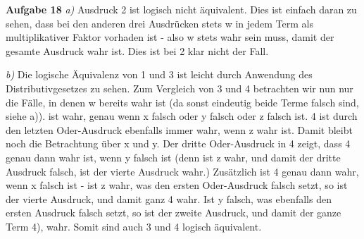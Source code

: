 \documentclass{article}
\begin{document}
\textbf{Aufgabe 18} \newline
\textit{a)}
Ausdruck 2 ist logisch nicht äquivalent. Dies ist einfach daran zu sehen, dass bei den anderen drei Ausdrücken stets w in jedem Term als multiplikativer Faktor vorhaden ist - also w stets wahr sein muss, damit der gesamte Ausdruck wahr ist. Dies ist bei 2 klar nicht der Fall. \linebreak

\textit{b)} Die logische Äquivalenz von 1 und 3 ist leicht durch Anwendung des Distributivgesetzes zu sehen. Zum Vergleich von 3 und 4 betrachten wir nun nur die Fälle, in denen w bereits wahr ist (da sonst eindeutig beide Terme falsch sind, siehe a)).  ist wahr, genau wenn x falsch oder y falsch oder z falsch ist. 4 ist durch den letzten Oder-Ausdruck ebenfalls immer wahr, wenn z wahr ist.
Damit bleibt noch die Betrachtung über x und y. \newline
Der dritte Oder-Ausdruck in 4 zeigt, dass 4 genau dann wahr ist, wenn y falsch ist (denn ist z wahr, und damit der dritte Ausdruck falsch, ist der vierte Ausdruck wahr.) \newline
Zusätzlich ist 4 genau dann wahr, wenn x falsch ist - ist z wahr, was den ersten Oder-Ausdruck falsch setzt, so ist der vierte Ausdruck, und damit ganz 4 wahr. Ist y falsch, was ebenfalls den ersten Ausdruck falsch setzt, so ist der zweite Ausdruck, und damit der ganze Term 4), wahr. Somit sind auch 3 und 4 logisch äquivalent.


	
\end{document}
